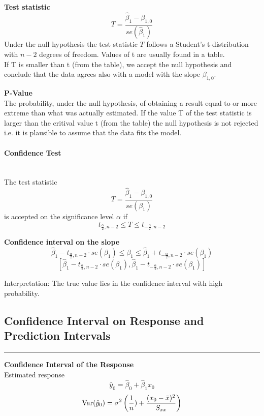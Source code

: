 \textbf{Test statistic}
\begin{equation}
  T = \frac{\hat{\beta}_1 - \beta_{1,0}}{se(\hat{\beta}_1)}
\end{equation}
Under the null hypothesis the test statistic $T$ follows a Student’s t-distribution with $n - 2$ degrees of freedom. Values of t are usually found in a table.\\
If T is smaller than t (from the table), we accept the null hypothesis and conclude that the data agrees also with a model with the slope $\beta_{1,0}$.


\textbf{P-Value}\\
The probability, under the null hypothesis, of obtaining a result equal to or more extreme than what was actually estimated. If the value T of the test statistic is larger than the critival value t (from the table) the null hypothesis is not rejected i.e. it is plausible to assume that the data fits the model.

\paragraph{Confidence Test}\mbox{}\\
The test statistic
\begin{equation}
  T = \frac{\hat{\beta}_1 - \beta_{1,0}}{se(\beta_1)}
\end{equation}
is accepted on the significance level $\alpha$ if
\begin{equation}
  t_{\frac{\alpha}{2}, n-2} \leq T \leq t_{-\frac{\alpha}{2}, n-2}
\end{equation}



\textbf{Confidence interval on the slope}
\begin{equation}
  \hat{\beta}_1 - t_{\frac{\alpha}{2}, n-2} \cdot se(\beta_1) \leq \beta_1 \leq  \hat{\beta}_1 + t_{-\frac{\alpha}{2}, n-2} \cdot se(\beta_1)
\end{equation}
\begin{equation}
  \left[\hat{\beta}_1 - t_{\frac{\alpha}{2}, n-2} \cdot se(\beta_1), \hat{\beta}_1 - t_{-\frac{\alpha}{2}, n-2} \cdot se(\beta_1)\right]
\end{equation}

Interpretation:
The true value lies in the confidence interval with high probability.

\subsection{Confidence Interval on Response and Prediction Intervals}
\noindent\rule[\linienAbstand]{\linewidth}{\linienDicke}
\textbf{Confidence Interval of the Response}\\
Estimated response
\begin{equation}
  \hat{y}_0 = \hat{\beta}_0 +  \hat{\beta}_1 x_0
\end{equation}
\begin{equation}
  \textup{Var}(\hat{y}_0) = \sigma^2\left(\frac{1}{n}) + \frac{(x_0 - \bar{x})^2}{S_{xx}}\right)
\end{equation}

